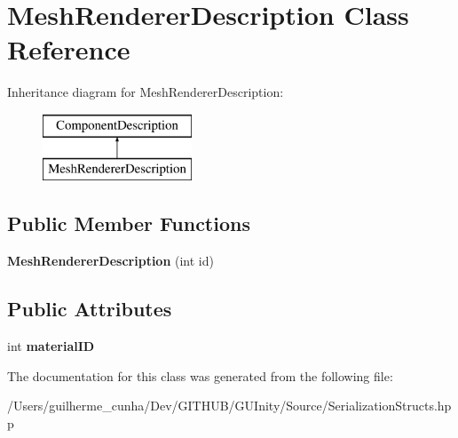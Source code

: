 \hypertarget{class_mesh_renderer_description}{}\section{Mesh\+Renderer\+Description Class Reference}
\label{class_mesh_renderer_description}
Inheritance diagram for Mesh\+Renderer\+Description\+:\begin{figure}[H]
\begin{center}
\leavevmode
\includegraphics[height=2.000000cm]{class_mesh_renderer_description}
\end{center}
\end{figure}
\subsection*{Public Member Functions}
\begin{DoxyCompactItemize}
\item 
\hypertarget{class_mesh_renderer_description_aa40317aa38cb73fb2d8ff1593043461d}{}{\bfseries Mesh\+Renderer\+Description} (int id)\label{class_mesh_renderer_description_aa40317aa38cb73fb2d8ff1593043461d}

\end{DoxyCompactItemize}
\subsection*{Public Attributes}
\begin{DoxyCompactItemize}
\item 
\hypertarget{class_mesh_renderer_description_ae22fbdf80f02ef9255b74af99d81cfd8}{}int {\bfseries material\+I\+D}\label{class_mesh_renderer_description_ae22fbdf80f02ef9255b74af99d81cfd8}

\end{DoxyCompactItemize}


The documentation for this class was generated from the following file\+:\begin{DoxyCompactItemize}
\item 
/\+Users/guilherme\+\_\+cunha/\+Dev/\+G\+I\+T\+H\+U\+B/\+G\+U\+Inity/\+Source/Serialization\+Structs.\+hpp\end{DoxyCompactItemize}
